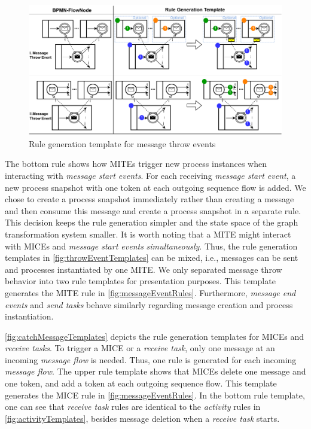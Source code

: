 \documentclass[runningheads]{llncs}
\begin{document}
\begin{figure}[ht]
    \centering
    \includegraphics[width=1\textwidth]{images/throw_messages.pdf}
    \caption{Rule generation template for message throw events}
    \label{fig:throwEventTemplates}
\end{figure}

The bottom rule shows how MITEs trigger new process instances when interacting with \textit{message start events}.
For each receiving \textit{message start event}, a new process snapshot with one token at each outgoing sequence flow is added.
We chose to create a process snapshot immediately rather than creating a message and then consume this message and create a process snapshot in a separate rule.
This decision keeps the rule generation simpler and the state space of the graph transformation system smaller.
It is worth noting that a MITE might interact with MICEs and \textit{message start events} \textit{simultaneously}.
Thus, the rule generation templates in \autoref{fig:throwEventTemplates} can be mixed, i.e., messages can be sent and processes instantiated by one MITE.
We only separated message throw behavior into two rule templates for presentation purposes.
This template generates the MITE rule in \autoref{fig:messageEventRules}.
Furthermore, \textit{message end events} and \textit{send tasks} behave similarly regarding message creation and process instantiation.

\autoref{fig:catchMessageTemplates} depicts the rule generation templates for MICEs and \textit{receive tasks}.
To trigger a MICE or a \textit{receive task}, only one message at an incoming \textit{message flow} is needed.
Thus, one rule is generated for each incoming \textit{message flow}.
The upper rule template shows that MICEs delete one message and one token, and add a token at each outgoing sequence flow.
This template generates the MICE rule in \autoref{fig:messageEventRules}.
In the bottom rule template, one can see that \textit{receive task} rules are identical to the \textit{activity} rules in \autoref{fig:activityTemplates},  besides message deletion when a \textit{receive task} starts.
\end{document}
